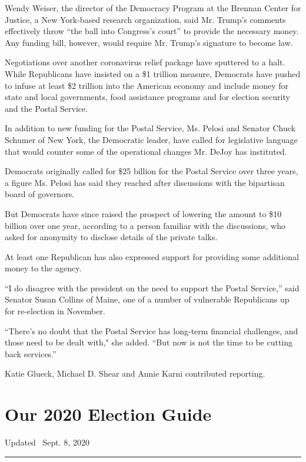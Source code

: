 Wendy Weiser, the director of the Democracy Program at the Brennan
Center for Justice, a New York-based research organization, said Mr.
Trump's comments effectively throw ``the ball into Congress's court'' to
provide the necessary money. Any funding bill, however, would require
Mr. Trump's signature to become law.

Negotiations over another coronavirus relief package have sputtered to a
halt. While Republicans have insisted on a \$1 trillion measure,
Democrats have pushed to infuse at least \$2 trillion into the American
economy and include money for state and local governments, food
assistance programs and for election security and the Postal Service.

In addition to new funding for the Postal Service, Ms. Pelosi and
Senator Chuck Schumer of New York, the Democratic leader, have called
for legislative language that would counter some of the operational
changes Mr. DeJoy has instituted.

Democrats originally called for \$25 billion for the Postal Service over
three years, a figure Ms. Pelosi has said they reached after discussions
with the bipartisan board of governors.

But Democrats have since raised the prospect of lowering the amount to
\$10 billion over one year, according to a person familiar with the
discussions, who asked for anonymity to disclose details of the private
talks.

At least one Republican has also expressed support for providing some
additional money to the agency.

``I do disagree with the president on the need to support the Postal
Service,'' said Senator Susan Collins of Maine, one of a number of
vulnerable Republicans up for re-election in November.

``There's no doubt that the Postal Service has long-term financial
challenges, and those need to be dealt with," she added. ``But now is
not the time to be cutting back services.''

Katie Glueck, Michael D. Shear and Annie Karni contributed reporting.

\hypertarget{our-2020-election-guide}{%
\section{Our 2020 Election Guide}\label{our-2020-election-guide}}

Updated ~Sept. 8, 2020

\begin{center}\rule{0.5\linewidth}{\linethickness}\end{center}

